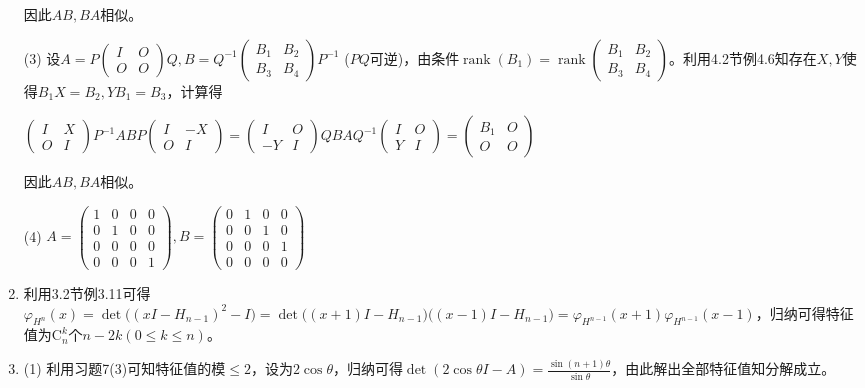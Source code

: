 \documentclass[a4paper,UTF8,fontset=windows]{ctexart}
\DeclareMathOperator{\rank}{rank}
\begin{document}
\begin{enumerate}
因此$AB,BA$相似。

(3) 设$A=P\begin{pmatrix}I&O\\O&O\end{pmatrix}Q,B=Q^{-1}\begin{pmatrix}B_1&B_2\\B_3&B_4\end{pmatrix}P^{-1}$ ($PQ$可逆)，由条件$\rank(B_1)=\rank\begin{pmatrix}B_1&B_2\\B_3&B_4\end{pmatrix}$。利用4.2节例4.6知存在$X,Y$使得$B_1X=B_2,YB_1=B_3$，计算得

$\begin{pmatrix}I&X\\O&I\end{pmatrix}P^{-1}ABP\begin{pmatrix}I&-X\\O&I\end{pmatrix}=\begin{pmatrix}I&O\\-Y&I\end{pmatrix}QBAQ^{-1}\begin{pmatrix}I&O\\Y&I\end{pmatrix}=\begin{pmatrix}B_1&O\\O&O\end{pmatrix}$

因此$AB,BA$相似。

(4) $A=\begin{pmatrix}1&0&0&0\\0&1&0&0\\0&0&0&0\\0&0&0&1\end{pmatrix},B=\begin{pmatrix}0&1&0&0\\0&0&1&0\\0&0&0&1\\0&0&0&0\end{pmatrix}$

\item
利用3.2节例3.11可得$\varphi_{H^n}(x)=\det\big((xI-H_{n-1})^2-I\big)=\det\big((x+1)I-H_{n-1}\big)\big((x-1)I-H_{n-1}\big)=\varphi_{H^{n-1}}(x+1)\varphi_{H^{n-1}}(x-1)$，归纳可得特征值为$\mathrm{C}_n^k$个$n-2k(0\le k\le n)$。

\item
(1) 利用习题7(3)可知特征值的模$\le2$，设为$2\cos{\theta}$，归纳可得$\det(2\cos{\theta}I-A)=\frac{\sin{(n+1)\theta}}{\sin{\theta}}$，由此解出全部特征值知分解成立。


\end{enumerate}
\end{document}

